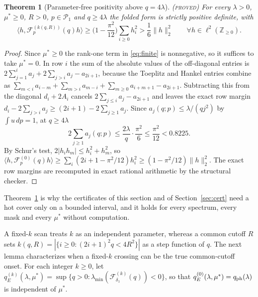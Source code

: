 \documentclass[11pt]{article}
\newcommand{\Fcal}{\mathcal F}
\newcommand{\muS}{\mu^{*}}
\newtheorem{theorem}{Theorem}[section]
\theoremstyle{definition}
\theoremstyle{remark}
\newcommand{\proved}{\textnormal{\textsc{(proved)}}}
\begin{document}
\begin{theorem}[Parameter-free positivity above $q=4\lambda$]\label{thm:asym}\proved
For every $\lambda>0$, $\muS\ge0$, $R>0$, $p\in\mathcal P_1$ and $q\ge4\lambda$ the
folded form is strictly positive definite, with
\begin{equation}\label{eq:asymstrict}
\langle h,\Fcal_p^{(k(q,R))}(q)h\rangle
\ge\Big(1-\frac{\pi^2}{12}\Big)\sum_{i\ge0}h_i^2>\frac16\|h\|_2^2
\qquad\forall h\in\ell^2(\mathbb Z_{\ge0}).
\end{equation}
\end{theorem}

\begin{proof}
Since $\muS\ge0$ the rank-one term in \eqref{eq:finite} is nonnegative, so it suffices to
take $\muS=0$. In row $i$ the sum of the absolute values of the off-diagonal entries is
$2\sum_{j=1}^i a_j+2\sum_{j>i}a_j-a_{2i+1}$, because the Toeplitz and Hankel entries
combine as $\sum_{m<i}a_{i-m}+\sum_{m>i}a_{m-i}+\sum_{m\ge0}a_{i+m+1}-a_{2i+1}$.
Subtracting this from the diagonal $d_i+2A_i$ cancels $2\sum_{j\le i}a_j-a_{2i+1}$ and
leaves the exact row margin $d_i-2\sum_{j>i}a_j\ge(2i+1)-2\sum_{j\ge1}a_j$. Since
$a_j(q;p)\le\lambda/(qj^2)$ by $\int u\,dp=1$, at $q\ge4\lambda$
\[
2\sum_{j\ge1}a_j(q;p)\le\frac{2\lambda}{q}\cdot\frac{\pi^2}{6}
\le\frac{\pi^2}{12}<0.8225 .
\]
By Schur's test, $2|h_ih_m|\le h_i^2+h_m^2$, so
$\langle h,\Fcal_p^{(0)}(q)h\rangle\ge\sum_i(2i+1-\pi^2/12)h_i^2
\ge(1-\pi^2/12)\|h\|_2^2$. The exact row margins are recomputed in exact rational
arithmetic by the structural checker.
\end{proof}

Theorem~\ref{thm:asym} is why the certificates of this section and of
Section~\ref{sec:cert} need a hot cover only on a bounded interval, and it holds for every
spectrum, every mask and every $\muS$ without computation.

A fixed-$k$ scan treats $k$ as an independent parameter, whereas a common cutoff $R$ sets
$k(q,R)=|\{i\ge0:(2i+1)^2q<4R^2\}|$ as a step function of $q$. The next lemma characterizes
when a fixed-$k$ crossing can be the true common-cutoff onset. For each integer $k\ge0$,
let $q_E^{(k)}(\lambda,\muS)=\sup\{q>0:\lambda_{\min}(\Fcal_{\delta_1}^{(k)}(q))<0\}$, so
that $q_E^{(0)}(\lambda,\muS)=q_{\rm ph}(\lambda)$ is independent of $\muS$.
\end{document}
